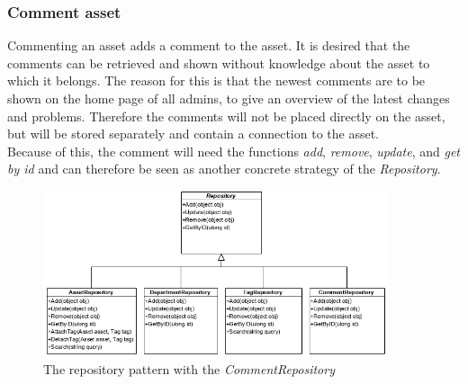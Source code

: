 \subsubsection{Comment asset}
Commenting an asset adds a comment to the asset. It is desired that the comments can be retrieved and shown without knowledge about the asset to which it belongs. The reason for this is that the newest comments are to be shown on the home page of all admins, to give an overview of the latest changes and problems. Therefore the comments will not be placed directly on the asset, but will be stored separately and contain a connection to the asset.\\
Because of this, the comment will need the functions \textit{add}, \textit{remove}, \textit{update}, and \textit{get by id} and can therefore be seen as another concrete strategy of the \textit{Repository}.
\begin{figure}[H]
    \centering
    \includegraphics[width=0.9\textwidth]{figures/FunctionComponent/CommentRepository.png}
    \caption{The repository pattern with the \textit{CommentRepository}}
    \label{fig:RepositoryPatternWithCommentRepository}
\end{figure}


